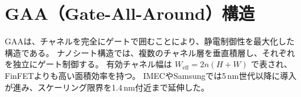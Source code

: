 \section{GAA（Gate-All-Around）構造}
GAAは、チャネルを完全にゲートで囲むことにより、静電制御性を最大化した構造である。  
ナノシート構造では、複数のチャネル層を垂直積層し、それぞれを独立にゲート制御する。  
有効チャネル幅は $W_\text{eff} = 2n(H + W)$ で表され、FinFETよりも高い面積効率を持つ。  
IMECやSamsungでは5\,nm世代以降に導入が進み、スケーリング限界を1.4\,nm付近まで延伸した。
